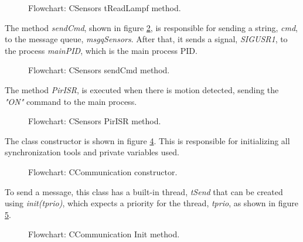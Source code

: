 \begin{figure}[H]
	\centering
	\caption{Flowchart: CSensors tReadLampf method.}
	\label{fig:CSensorstreadlampf}
\end{figure}

The method \textit{sendCmd}, shown in figure \ref{fig:CSensorssendcmd}, is responsible for sending a string, \textit{cmd}, to the message queue, \textit{msgqSensors}. After that, it sends a signal, \textit{SIGUSR1}, to the process \textit{mainPID}, which is the main process PID.

\begin{figure}[H]
	\centering
	\caption{Flowchart: CSensors sendCmd method.}
	\label{fig:CSensorssendcmd}
\end{figure}

The method \textit{PirISR}, is executed when there is motion detected, sending the \textit{"ON"} command to the main process.

\begin{figure}[H]
	\centering
	\caption{Flowchart: CSensors PirISR method.}
	\label{fig:CSensorspirisr}
\end{figure}

\clearpage
{}

The class constructor is shown in figure \ref{fig:CCommunicationConstructor}. This is responsible for initializing all synchronization tools and private variables used.

\begin{figure}[H]
	\centering
	\caption{Flowchart: CCommunication constructor.}
	\label{fig:CCommunicationConstructor}
\end{figure}

To send a message, this class has a built-in thread, \textit{tSend} that can be created using \textit{init(tprio)}, which expects a priority for the thread, \textit{tprio}, as shown in figure \ref{fig:CCommunicationinit}.

\begin{figure}[H]
	\centering
	\caption{Flowchart: CCommunication Init method.}
	\label{fig:CCommunicationinit}
\end{figure}

